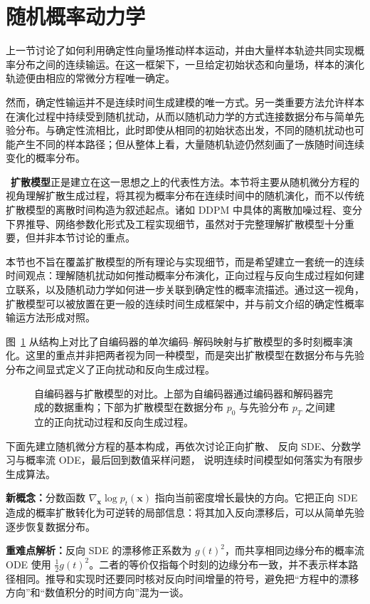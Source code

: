 \section{随机概率动力学}

上一节讨论了如何利用确定性向量场推动样本运动，并由大量样本轨迹共同实现概率分布之间的连续输运。在这一框架下，一旦给定初始状态和向量场，样本的演化轨迹便由相应的常微分方程唯一确定。

然而，确定性输运并不是连续时间生成建模的唯一方式。另一类重要方法允许样本在演化过程中持续受到随机扰动，从而以随机动力学的方式连接数据分布与简单先验分布。与确定性流相比，此时即使从相同的初始状态出发，不同的随机扰动也可能产生不同的样本路径；但从整体上看，大量随机轨迹仍然刻画了一族随时间连续变化的概率分布。

~\textbf{扩散模型}正是建立在这一思想之上的代表性方法。本节将主要从随机微分方程的视角理解扩散生成过程，将其视为概率分布在连续时间中的随机演化，而不以传统扩散模型的离散时间构造为叙述起点。诸如 DDPM 中具体的离散加噪过程、变分下界推导、网络参数化形式及工程实现细节，虽然对于完整理解扩散模型十分重要，但并非本节讨论的重点。

本节也不旨在覆盖扩散模型的所有理论与实现细节，而是希望建立一套统一的连续时间观点：理解随机扰动如何推动概率分布演化，正向过程与反向生成过程如何建立联系，以及随机动力学如何进一步关联到确定性的概率流描述。通过这一视角，扩散模型可以被放置在更一般的连续时间生成框架中，并与前文介绍的确定性概率输运方法形成对照。

图~\ref{fig:autoencoder} 从结构上对比了自编码器的单次编码--解码映射与扩散模型的多时刻概率演化。这里的重点并非把两者视为同一种模型，而是突出扩散模型在数据分布与先验分布之间显式定义了正向扰动和反向生成过程。

\begin{figure}[!t]
\centering
{}
\caption{自编码器与扩散模型的对比。上部为自编码器通过编码器和解码器完成的数据重构；下部为扩散模型在数据分布 \(p_0\) 与先验分布 \(p_T\) 之间建立的正向扰动过程和反向生成过程。}
\label{fig:autoencoder}
\end{figure}

下面先建立随机微分方程的基本构成，再依次讨论正向扩散、
反向 SDE、分数学习与概率流 ODE，最后回到数值采样问题，
说明连续时间模型如何落实为有限步生成算法。

\begin{importantnote}
\textbf{新概念：}分数函数 \(\nabla_{\boldsymbol{x}}\log p_t(\boldsymbol{x})\) 指向当前密度增长最快的方向。它把正向 SDE 造成的概率扩散转化为可逆转的局部信息：将其加入反向漂移后，可以从简单先验逐步恢复数据分布。

\textbf{重难点解析：}反向 SDE 的漂移修正系数为 \(g(t)^2\)，而共享相同边缘分布的概率流 ODE 使用 \(\tfrac12 g(t)^2\)。二者的等价仅指每个时刻的边缘分布一致，并不表示样本路径相同。推导和实现时还要同时核对反向时间增量的符号，避免把“方程中的漂移方向”和“数值积分的时间方向”混为一谈。
\end{importantnote}

